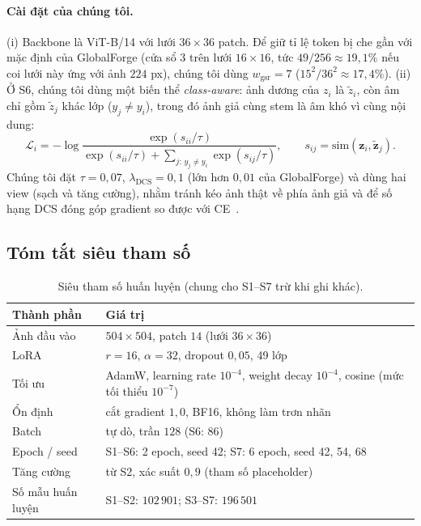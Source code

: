 \documentclass[11pt,a4paper]{article}
\begin{document}
\paragraph{Cài đặt của chúng tôi.} (i) Backbone là ViT-B/14 với lưới $36\times36$ patch. Để giữ tỉ lệ token bị che gần với mặc định của GlobalForge (cửa sổ $3$ trên lưới $16\times16$, tức $49/256\approx19{,}1\%$ nếu coi lưới này ứng với ảnh $224$ px), chúng tôi dùng $w_{\text{gsr}}=7$ ($15^2/36^2\approx17{,}4\%$). (ii) Ở S6, chúng tôi dùng một biến thể \emph{class-aware}: ảnh dương của $z_i$ là $\tilde z_i$, còn âm chỉ gồm $\tilde z_j$ khác lớp ($y_j\neq y_i$), trong đó ảnh giả cùng stem là âm khó vì cùng nội dung:
\begin{equation}
\mathcal{L}_i=-\log\frac{\exp(s_{ii}/\tau)}{\exp(s_{ii}/\tau)+\sum_{j:\,y_j\neq y_i}\exp(s_{ij}/\tau)},\qquad s_{ij}=\mathrm{sim}(\mathbf{z}_i,\tilde{\mathbf{z}}_j).
\end{equation}
Chúng tôi đặt $\tau=0{,}07$, $\lambda_{\text{DCS}}=0{,}1$ (lớn hơn $0{,}01$ của GlobalForge) và dùng hai view (sạch và tăng cường), nhằm tránh kéo ảnh thật về phía ảnh giả và để số hạng DCS đóng góp gradient so được với CE~\cite{baopv051_2025_xla_training_s6}.

\subsection{Tóm tắt siêu tham số}
\begin{table}[htbp]\centering\small
\caption{Siêu tham số huấn luyện (chung cho S1--S7 trừ khi ghi khác).}\label{tab:hp}
\begin{tabularx}{\linewidth}{lX}
\toprule
Thành phần & Giá trị \\
\midrule
Ảnh đầu vào & $504\times504$, patch $14$ (lưới $36\times36$) \\
LoRA & $r=16$, $\alpha=32$, dropout $0{,}05$, 49 lớp \\
Tối ưu & AdamW, learning rate $10^{-4}$, weight decay $10^{-4}$, cosine (mức tối thiểu $10^{-7}$) \\
Ổn định & cắt gradient $1{,}0$, BF16, không làm trơn nhãn \\
Batch & tự dò, trần $128$ (S6: $86$) \\
Epoch / seed & S1--S6: 2 epoch, seed 42; S7: 6 epoch, seed 42, 54, 68 \\
Tăng cường & từ S2, xác suất $0{,}9$ (tham số placeholder) \\
Số mẫu huấn luyện & S1--S2: $102\,901$; S3--S7: $196\,501$ \\
\bottomrule
\end{tabularx}
\end{table}
\end{document}

